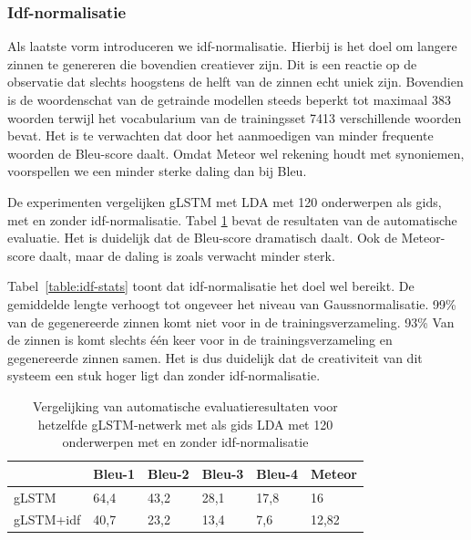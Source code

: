 \subsubsection{Idf-normalisatie}
Als laatste vorm introduceren we idf-normalisatie. Hierbij is het doel om langere zinnen te genereren die bovendien creatiever zijn.
Dit is een reactie op de observatie dat slechts hoogstens de helft van de zinnen echt uniek zijn. Bovendien is de woordenschat van de getrainde modellen steeds beperkt tot
maximaal 383 woorden terwijl het vocabularium van de trainingsset 7413 verschillende woorden bevat.
Het is te verwachten dat door het aanmoedigen van minder frequente woorden de Bleu-score daalt. Omdat Meteor wel rekening houdt met synoniemen, voorspellen we een minder sterke daling dan bij Bleu.

De experimenten vergelijken gLSTM met LDA met 120 onderwerpen als gids, met en zonder idf-normalisatie.
Tabel \ref{table:idf-results} bevat de resultaten van de automatische evaluatie. Het is duidelijk dat de Bleu-score dramatisch daalt. Ook de Meteor-score daalt, maar de daling is zoals verwacht minder sterk.

Tabel~\ref{table:idf-stats} toont dat idf-normalisatie het doel wel bereikt. De gemiddelde lengte verhoogt tot ongeveer het niveau van Gaussnormalisatie. 99\% van de gegenereerde zinnen komt niet voor in de trainingsverzameling. 93\% Van de zinnen is komt slechts \'e\'en keer voor in de trainingsverzameling en gegenereerde zinnen samen. Het is dus duidelijk dat de creativiteit van dit systeem een stuk hoger ligt dan zonder idf-normalisatie.
\begin{table}
	\centering
	\begin{tabular}{llllll}
		~                  & Bleu-1 & Bleu-2 & Bleu-3 & Bleu-4 & Meteor \\ \hline
		gLSTM        & 64,4   & 43,2 			& 28,1   & 17,8   & 16 \\
		gLSTM+idf   & 40,7   & 23,2   & 13,4   & 7,6 & 12,82 \\ \hline
		
	\end{tabular}
	
	\caption{Vergelijking van automatische evaluatieresultaten voor hetzelfde gLSTM-netwerk met als gids LDA met 120 onderwerpen met en zonder idf-normalisatie}
	\label{table:idf-results}
\end{table}

